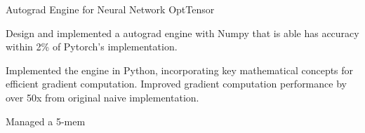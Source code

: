 \cventry
{Autograd Engine for Neural Network} %
{OptTensor} %
{\href{https://github.com/giathuan123/mynn}{\faGithubSquare}} %
{ \diPythonPlain \diPytorchPlain} %
{
	\begin{cvitems} %
    \item {Design and implemented a autograd engine with Numpy that is able has accuracy within 2\% of Pytorch's implementation.}
    \item {Implemented the engine in Python, incorporating key mathematical concepts for efficient gradient computation. Improved gradient computation performance by over 50x from original naive implementation.}
    \item {Managed a 5-mem}
	\end{cvitems}
}
